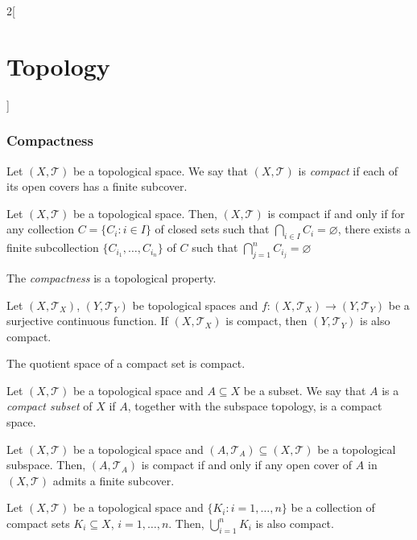 \documentclass[../../../main.tex]{subfiles}
\begin{document}
\begin{multicols}{2}[\section{Topology}]
  \subsubsection{Compactness}
  \begin{definition}
    Let $(X,\mathcal{T})$ be a topological space. We say that $(X,\mathcal{T})$ is \textit{compact} if each of its open covers has a finite subcover.
  \end{definition}
  \begin{prop}
    Let $(X,\mathcal{T})$ be a topological space. Then, $(X,\mathcal{T})$ is compact if and only if for any collection $C=\{C_i:i\in I\}$ of closed sets such that $\bigcap_{i\in I} C_i=\varnothing$, there exists a finite subcollection $\{C_{i_1},\ldots,C_{i_n}\}$ of $C$ such that $\bigcap_{j=1}^n C_{i_j}=\varnothing$
  \end{prop}
  \begin{prop}
    The \textit{compactness} is a topological property.
  \end{prop}
  \begin{prop}
    Let $(X,\mathcal{T}_X)$, $(Y,\mathcal{T}_Y)$ be topological spaces and $f:(X,\mathcal{T}_X)\rightarrow(Y,\mathcal{T}_Y)$ be a surjective continuous function. If $(X,\mathcal{T}_X)$ is compact, then $(Y,\mathcal{T}_Y)$ is also compact.
  \end{prop}
  \begin{corollary}
    The quotient space of a compact set is compact.
  \end{corollary}
  \begin{definition}
    Let $(X,\mathcal{T})$ be a topological space and $A\subseteq X$ be a subset. We say that $A$ is a \textit{compact subset} of $X$ if $A$, together with the subspace topology, is a compact space.
  \end{definition}
  \begin{lemma}
    Let $(X,\mathcal{T})$ be a topological space and $(A,\mathcal{T}_A)\subseteq (X,\mathcal{T})$ be a topological subspace. Then, $(A,\mathcal{T}_A)$ is compact if and only if any open cover of $A$ in $(X,\mathcal{T})$ admits a finite subcover.
  \end{lemma}
  \begin{prop}
    Let $(X,\mathcal{T})$ be a topological space and $\{K_i:i=1,\ldots,n\}$ be a collection of compact sets $K_i\subseteq X$, $i=1,\ldots,n$. Then, $\bigcup_{i=1}^nK_i$ is also compact.
  \end{prop}
  \begin{prop}

\end{prop}
\end{multicols}
\end{document}
